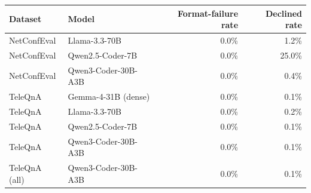 \begin{tabular}{llrr}
\toprule
Dataset & Model & Format-failure rate & Declined rate \\
\midrule
NetConfEval & Llama-3.3-70B & 0.0\% & 1.2\% \\
NetConfEval & Qwen2.5-Coder-7B & 0.0\% & 25.0\% \\
NetConfEval & Qwen3-Coder-30B-A3B & 0.0\% & 0.4\% \\
TeleQnA & Gemma-4-31B (dense) & 0.0\% & 0.1\% \\
TeleQnA & Llama-3.3-70B & 0.0\% & 0.2\% \\
TeleQnA & Qwen2.5-Coder-7B & 0.0\% & 0.1\% \\
TeleQnA & Qwen3-Coder-30B-A3B & 0.0\% & 0.1\% \\
TeleQnA (all) & Qwen3-Coder-30B-A3B & 0.0\% & 0.1\% \\
\bottomrule
\end{tabular}

